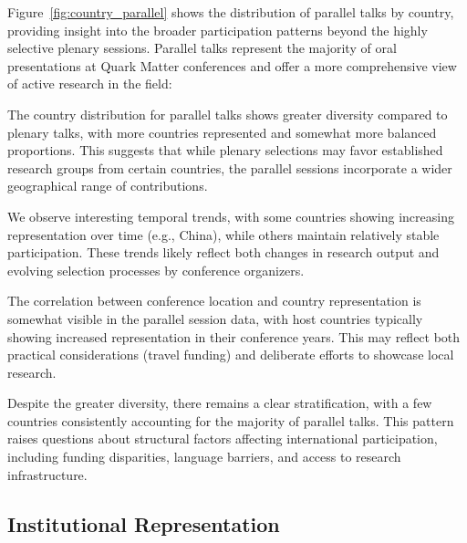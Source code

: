 \documentclass[a4paper,11pt]{article}
\begin{document}
Figure~\ref{fig:country_parallel} shows the distribution of parallel talks by country, providing insight into the broader participation patterns beyond the highly selective plenary sessions. Parallel talks represent the majority of oral presentations at Quark Matter conferences and offer a more comprehensive view of active research in the field:

The country distribution for parallel talks shows greater diversity compared to plenary talks, with more countries represented and somewhat more balanced proportions. This suggests that while plenary selections may favor established research groups from certain countries, the parallel sessions incorporate a wider geographical range of contributions.

We observe interesting temporal trends, with some countries showing increasing representation over time (e.g., China), while others maintain relatively stable participation. These trends likely reflect both changes in research output and evolving selection processes by conference organizers.

The correlation between conference location and country representation is somewhat visible in the parallel session data, with host countries typically showing increased representation in their conference years. This may reflect both practical considerations (travel funding) and deliberate efforts to showcase local research.

Despite the greater diversity, there remains a clear stratification, with a few countries consistently accounting for the majority of parallel talks. This pattern raises questions about structural factors affecting international participation, including funding disparities, language barriers, and access to research infrastructure.

\subsection{Institutional Representation}
\end{document}
